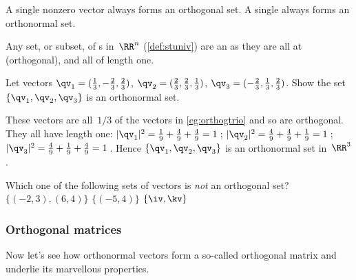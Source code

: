 A single nonzero vector always forms an orthogonal set.  
A single  always forms an orthonormal set.


\begin{example} 
Any set, or subset, of s in~\(\RR^n\) (\cref{def:stuniv}) are an  as they are all at  (orthogonal), and all of length one.
\end{example}

\begin{example} 
Let vectors \(\qv_1=(\frac13,-\frac23,\frac23)\), \(\qv_2=(\frac23,\frac23,\frac13)\), \(\qv_3=(-\frac23,\frac13,\frac23)\).  
Show the set \(\{\qv_1,\qv_2,\qv_3\}\) is an orthonormal set.
\begin{solution} 
These vectors are all~\(1/3\) of the vectors in \cref{eg:orthogtrio} and so are orthogonal.
They all have length one:
\(|\qv_1|^2={\frac19+\frac49+\frac49}=1\)\,;
\(|\qv_2|^2={\frac49+\frac49+\frac19}=1\)\,;
\(|\qv_3|^2={\frac49+\frac19+\frac49}=1\)\,.
Hence \(\{\qv_1,\qv_2,\qv_3\}\) is an orthonormal set in~\(\RR^3\). 
\end{solution}
\end{example}



\begin{activity}
Which one of the following sets of vectors is \emph{not} an orthogonal set?
{\(\{(-2,3),(6,4)\}\)}
{\(\{(-5,4)\}\)}
{\(\{\iv,\kv\}\)}
\end{activity}





\subsubsection{Orthogonal matrices}

Now let's see how orthonormal vectors form a so-called orthogonal matrix and underlie its marvellous properties.

